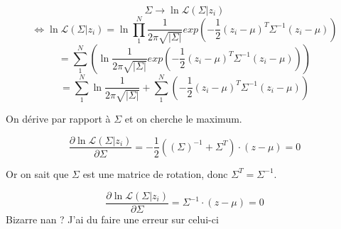 \documentclass{article}
\begin{document}
$$\Sigma \rightarrow \ln \mathcal{L}(\Sigma | z_i)$$
$$\Leftrightarrow \ln \mathcal{L}(\Sigma | z_i)=\ln \prod_{1}^{N} \frac{1}{2\pi\sqrt{|\Sigma|}}exp(-\frac{1}{2}(z_i-\mu)^{T}\Sigma^{-1}(z_i-\mu))$$
$$= \sum_{1}^{N} (\ln \frac{1}{2\pi\sqrt{|\Sigma|}}exp(-\frac{1}{2}(z_i-\mu)^{T}\Sigma^{-1}(z_i-\mu)))$$
$$= \sum_{1}^{N}\ln \frac{1}{2\pi\sqrt{|\Sigma|}} + \sum_{1}^{N}(-\frac{1}{2}(z_i-\mu)^{T}\Sigma^{-1}(z_i-\mu))$$

On dérive par rapport à $\Sigma$ et on cherche le maximum.

$$\frac{\partial \ln \mathcal{L}(\Sigma | z_i)}{\partial \Sigma}=-\frac{1}{2}((\Sigma)^{-1}+\Sigma^{T})\cdot(z-\mu)=0$$

Or on sait que $\Sigma$ est une matrice de rotation, donc $\Sigma^{T}=\Sigma^{-1}$.

$$\frac{\partial \ln \mathcal{L}(\Sigma | z_i)}{\partial \Sigma}=\Sigma^{-1}\cdot(z-\mu)=0$$
Bizarre nan ? J'ai du faire une erreur sur celui-ci
\end{document}
